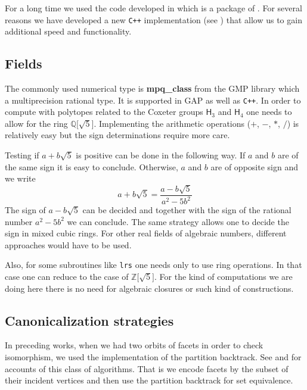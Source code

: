 \documentclass[12pt]{amsart}
\newcommand{\QQ}{\ensuremath{\mathbb{Q}}}
\newcommand{\ZZ}{\ensuremath{\mathbb{Z}}}
\begin{document}
For a long time we used the code developed in \cite{polyhedral_gap} which is a
package of \cite{gap}. For several reasons we have developed a new {\tt C++}
implementation (see \cite{polyhedral_cpp}) that allow us to gain additional speed
and functionality.





\subsection{Fields}

The commonly used numerical type is {\bf mpq\_class} from the GMP library
which a multiprecision rational type. It is supported in GAP as well as {\tt C++}.
In order to compute with polytopes related to the Coxeter groups $\mathsf{H}_3$ and $\mathsf{H}_4$
one needs to allow for the ring $\QQ\lbrack \sqrt{5}\rbrack$.
Implementing the arithmetic operations ($+$, $-$, $*$, $/$) is relatively easy
but the sign determinations require more care.

Testing if $a + b \sqrt{5}$ is positive can be done in the following way.
If $a$ and $b$ are of the same sign it is easy to conclude.
Otherwise, $a$ and $b$ are of opposite sign and we write
\begin{equation*}
a + b \sqrt{5} = \frac{a - b \sqrt{5}}{a^2 - 5 b^2}
\end{equation*}
The sign of $a - b \sqrt{5}$ can be decided and together with the sign of the
rational number $a^2 - 5 b^2$ we can conclude.
The same strategy allows one to decide the sign in mixed cubic rings.
For other real fields of algebraic numbers, different approaches would have
to be used.

Also, for some subroutines like {\tt lrs} one needs only to use ring operations.
In that case one can reduce to the case of $\ZZ\lbrack \sqrt{5}\rbrack$. For the kind
of computations we are doing here there is no need for algebraic closures or such
kind of constructions.

\subsection{Canonicalization strategies}

In preceding works, when we had two orbits of facets in order to check isomorphism,
we used the \cite{gap} implementation of the partition backtrack. See \cite{Leon1,Leon2}
and \cite{JeffersonReExplaination} for accounts of this class of algorithms.
That is we encode facets by the subset of their incident vertices and then use the
partition backtrack for set equivalence.
\end{document}
